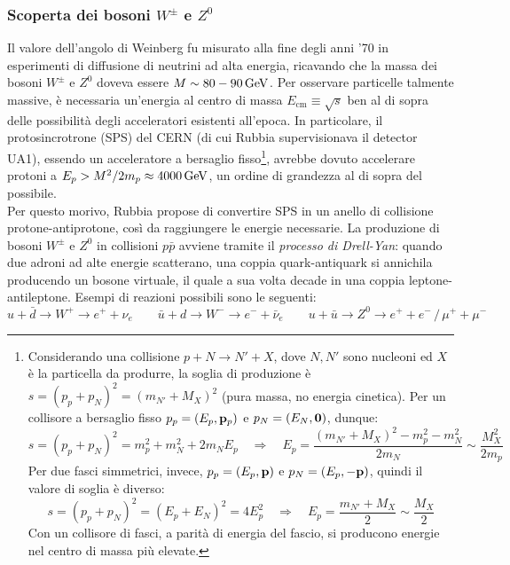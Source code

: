 \subsubsection{Scoperta dei bosoni \texorpdfstring{$ W^{\pm} $}{TEXT} e \texorpdfstring{$ Z^0 $}{TEXT}}

Il valore dell'angolo di Weinberg fu misurato alla fine degli anni '70 in esperimenti di diffusione di neutrini ad alta energia, ricavando che la massa dei bosoni $ W^{\pm} $ e $ Z^0 $ doveva essere $ M \sim 80 - 90 \,\mathrm{GeV} $. Per osservare particelle talmente massive, è necessaria un'energia al centro di massa $ E_{\text{cm}} \equiv \sqrt{s} $ ben al di sopra delle possibilità degli acceleratori esistenti all'epoca. In particolare, il protosincrotrone (SPS) del CERN (di cui Rubbia supervisionava il detector UA1), essendo un acceleratore a bersaglio fisso\footnote{Considerando una collisione $ p + N \rightarrow N' + X $, dove $ N,N' $ sono nucleoni ed $ X $ è la particella da produrre, la soglia di produzione è $ s = (p_p + p_N)^2 = (m_{N'} + M_X)^2 $ (pura massa, no energia cinetica). Per un collisore a bersaglio fisso $ p_p = (E_p,\mathbf{p}_p) $ e $ p_N = (E_N, \mathbf{0}) $, dunque:
\begin{equation*}
	s = (p_p + p_N)^2 = m_p^2 + m_N^2 + 2m_N E_p
	\quad \Rightarrow \quad
	E_p = \frac{(m_{N'} + M_X)^2 - m_p^2 - m_N^2}{2m_N} \sim \frac{M_X^2}{2m_p}
\end{equation*}
Per due fasci simmetrici, invece, $ p_p = (E_p,\mathbf{p}) $ e $ p_{N} = (E_p, -\mathbf{p}) $, quindi il valore di soglia è diverso:
\begin{equation*}
	s = (p_p + p_N)^2 = (E_p + E_N)^2 = 4E_p^2
	\quad \Rightarrow \quad
	E_p = \frac{m_{N'} + M_X}{2} \sim \frac{M_X}{2}
\end{equation*}
Con un collisore di fasci, a parità di energia del fascio, si producono energie nel centro di massa più elevate.}, avrebbe dovuto accelerare protoni a $ E_p > M^2 / 2m_p \approx 4000\,\mathrm{GeV} $, un ordine di grandezza al di sopra del possibile.\\
Per questo morivo, Rubbia propose di convertire SPS in un anello di collisione protone-antiprotone, così da raggiungere le energie necessarie. La produzione di bosoni $ W^{\pm} $ e $ Z^0 $ in collisioni $ p\bar{p} $ avviene tramite il \textit{processo di Drell-Yan}: quando due adroni ad alte energie scatterano, una coppia quark-antiquark si annichila producendo un bosone virtuale, il quale a sua volta decade in una coppia leptone-antileptone. Esempi di reazioni possibili sono le seguenti:
\begin{equation*}
	u + \bar{d} \rightarrow W^+ \rightarrow e^+ + \nu_e
	\qquad
	\bar{u} +  d \rightarrow W^-\rightarrow e^- + \bar{\nu}_e
	\qquad
	u + \bar{u} \rightarrow Z^0 \rightarrow e^+ + e^- \,/\, \mu^+ + \mu^-
\end{equation*}
